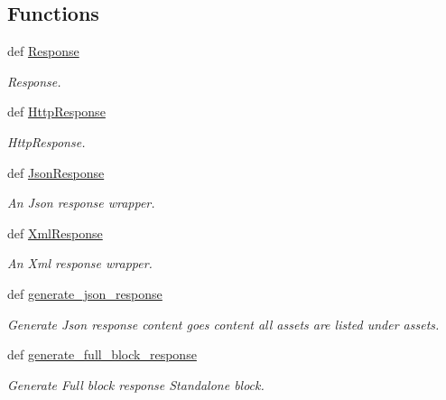 \subsection*{Functions}
\begin{DoxyCompactItemize}
\item 
def \hyperlink{namespacecore_1_1helper_1_1response__help_ab2faba868060339b941d34a0b5c5cd24}{Response}
\begin{DoxyCompactList}\small\item\em Response. \end{DoxyCompactList}\item 
def \hyperlink{namespacecore_1_1helper_1_1response__help_aca3adacc8591a26b1fec26c0ebbdcd2a}{Http\-Response}
\begin{DoxyCompactList}\small\item\em Http\-Response. \end{DoxyCompactList}\item 
def \hyperlink{namespacecore_1_1helper_1_1response__help_ac74f55f79b69bfe2075b9248b5bc4b4f}{Json\-Response}
\begin{DoxyCompactList}\small\item\em An Json response wrapper. \end{DoxyCompactList}\item 
def \hyperlink{namespacecore_1_1helper_1_1response__help_a85d09af10f91d8b83e7b6eadd8c4dc0b}{Xml\-Response}
\begin{DoxyCompactList}\small\item\em An Xml response wrapper. \end{DoxyCompactList}\item 
def \hyperlink{namespacecore_1_1helper_1_1response__help_adc314efd87e98f09a436eb050b416995}{generate\-\_\-json\-\_\-response}
\begin{DoxyCompactList}\small\item\em Generate Json response content goes content all assets are listed under assets. \end{DoxyCompactList}\item 
def \hyperlink{namespacecore_1_1helper_1_1response__help_a4d078fc7437fdba1e6dc423566517611}{generate\-\_\-full\-\_\-block\-\_\-response}
\begin{DoxyCompactList}\small\item\em Generate Full block response Standalone block. \end{DoxyCompactList}\end{DoxyCompactItemize}


